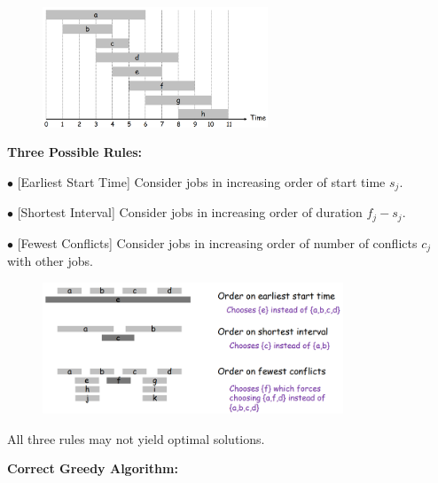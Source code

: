 \documentclass[10pt]{article}
\begin{document}
\begin{figure}[h]
	\centering
	\includegraphics[width=0.6\textwidth]{img5-1}
\end{figure}

\textbf{Three Possible Rules:}

$\bullet$ [Earliest Start Time] Consider jobs in increasing order of start time $s_j$.

$\bullet$ [Shortest Interval] Consider jobs in increasing order of duration $f_j - s_j$.

$\bullet$ [Fewest Conflicts] Consider jobs in increasing order of number of conflicts $c_j$ with other jobs.

\begin{figure}[h]
	\centering
	\includegraphics[width=0.8\textwidth]{img5-2}
\end{figure}

All three rules may not yield optimal solutions.

\newpage

\textbf{Correct Greedy Algorithm:}
\end{document}

